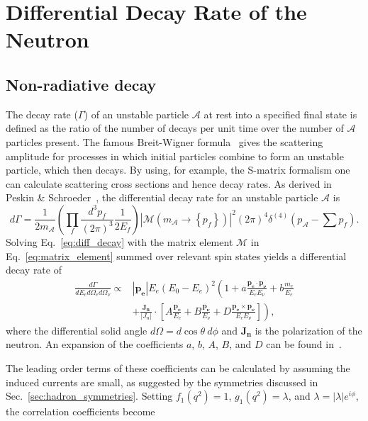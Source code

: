 \documentclass[oneside,12pt]{memoir}
\begin{document}
\section{Differential Decay Rate of the Neutron}
\label{sec:decay_rates}

\subsection{Non-radiative decay}
\label{sec:non_rad_decay}
The decay rate ($\Gamma$) of an unstable particle $\mathcal{A}$ at rest into a specified final state is defined as the ratio of the number of decays per unit time over the number of $\mathcal{A}$ particles present. The famous Breit-Wigner formula~\cite{Breit36} gives the scattering amplitude for processes in which initial particles combine to form an unstable particle, which then decays. By using, for example, the S-matrix formalism one can calculate scattering cross sections and hence decay rates. As derived in Peskin \& Schroeder~\cite{peskin95}, the differential decay rate for an unstable particle $\mathcal{A}$ is
\begin{equation}
	d\Gamma=\frac{1}{2m_{\mathcal{A}}}\left(
		\prod_{f}{\frac{d^3p_f}{\left(2\pi\right)^3}\frac{1}{2E_f}}
		\right)\left|\mathcal{M}\left(m_{\mathcal{A}}
		\longrightarrow\left\{p_f\right\}\right)\right|^2
		\left(2\pi\right)^4\delta^{\left(4\right)}\left(
		p_{\mathcal{A}}-\sum p_f\right).
	\label{eq:diff_decay}
\end{equation}
Solving Eq.~\ref{eq:diff_decay} with the matrix element $\mathcal{M}$ in Eq.~\ref{eq:matrix_element} summed over relevant spin states yields a differential decay rate of
\begin{align}
	\frac{d\Gamma}{dE_e d\Omega_e d\Omega_\nu}
		\propto & \left|\mathbf{p_e}\right|E_e\left(E_0-E_e\right)^2
		\left(1+a\frac{\mathbf{p_e}\cdot \mathbf{p_\nu}}{E_e E_\nu}+
		b\frac{m_e}{E_e} \right.\nonumber\\
	& \left.+\frac{\mathbf{J_n}}{\left|J_n\right|}
		\cdot\left[A\frac{\mathbf{p_e}}{E_e}
		+B\frac{\mathbf{p_\nu}}{E_\nu}
		+D\frac{\mathbf{p_e}\times \mathbf{p_\nu}}
			{E_e E_\nu}\right]\right),
	\label{eq:n_diff_decay}
\end{align}
where the differential solid angle $d\Omega = d\cos\theta\:d\phi$ and $\mathbf{J_n}$ is the polarization of the neutron. An expansion of the coefficients $a$, $b$, $A$, $B$, and $D$ can be found in~\cite{jackson57}.\par
The leading order terms of these coefficients can be calculated by assuming the induced currents are small, as suggested by the symmetries discussed in Sec.~\ref{sec:hadron_symmetries}. Setting $f_1\left(q^2\right)=1$, $g_1\left(q^2\right)=\lambda$, and $\lambda=\left|\lambda\right|e^{i\phi}$, the correlation coefficients become
\end{document}
